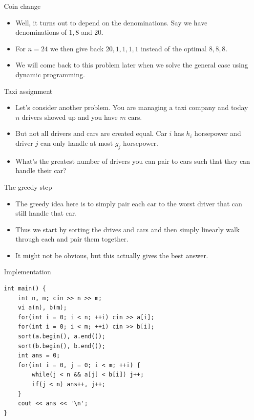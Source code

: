 \documentclass{beamer}
\begin{document}
\begin{frame}[plain]{Coin change}
    \begin{itemize}
        \item Well, it turns out to depend on the denominations. Say we have denominations of $1, 8$ and $20$.
        \item For $n = 24$ we then give back $20, 1, 1, 1, 1$ instead of the optimal $8, 8, 8$.
        \item We will come back to this problem later when we solve the general case using dynamic programming.
    \end{itemize}
\end{frame}

\begin{frame}[plain]{Taxi assignment}
    \begin{itemize}
        \item Let's consider another problem. You are managing a taxi company and today $n$ drivers showed up and you have $m$ cars. 
        \item But not all drivers and cars are created equal. Car $i$ has $h_i$ horsepower and driver $j$ can only handle at most $g_j$ horsepower.
        \item What's the greatest number of drivers you can pair to cars such that they can handle their car?
    \end{itemize}
\end{frame}

\begin{frame}[plain]{The greedy step}
    \begin{itemize}
        \item The greedy idea here is to simply pair each car to the worst driver that can still handle that car.
        \item Thus we start by sorting the drives and cars and then simply linearly walk through each and pair them together.
        \item It might not be obvious, but this actually gives the best answer.
    \end{itemize}
\end{frame}

\begin{frame}{Implementation}
\begin{verbatim}
int main() {
    int n, m; cin >> n >> m;
    vi a(n), b(m);
    for(int i = 0; i < n; ++i) cin >> a[i];
    for(int i = 0; i < m; ++i) cin >> b[i];
    sort(a.begin(), a.end());
    sort(b.begin(), b.end());
    int ans = 0;
    for(int i = 0, j = 0; i < m; ++i) {
        while(j < n && a[j] < b[i]) j++;
        if(j < n) ans++, j++;
    }
    cout << ans << '\n';
}
\end{verbatim}
\end{frame}
\end{document}

